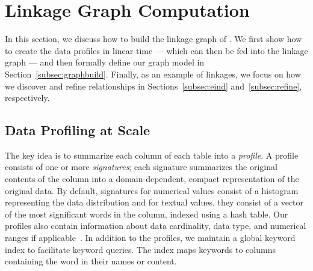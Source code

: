 \section{Linkage Graph Computation}
\label{sec:stitching}

In this section, we discuss how to build the linkage graph of \dcv. We first
show how to create the data profiles in linear time --- which can then be fed into
the linkage graph --- and then formally define our graph model in
Section~\ref{subsec:graphbuild}. Finally, as an example of linkages, we focus on
how we discover and refine \pkfk relationships in Sections~\ref{subsec:eind}
and~\ref{subsec:refine}, respectively.



\subsection{Data Profiling at Scale}\label{subsec:profile}

The key idea is to summarize each column of each table into a {\em profile}.
A profile consists of one or more {\it signatures};  each signature summarizes
the original contents of the column into a domain-dependent, compact
representation of the original data.  
By default, signatures for numerical values consist of a
histogram representing the data distribution and
 for textual values, they consist of a vector
of the most significant words in the column, indexed using a hash table.  Our profiles also
contain information about data cardinality, data type, and numerical ranges if
applicable~\cite{profiling_survey}. In addition to the profiles, we maintain a
global keyword index to facilitate keyword queries. The index maps keywords to
columns containing the word in their names or content.


